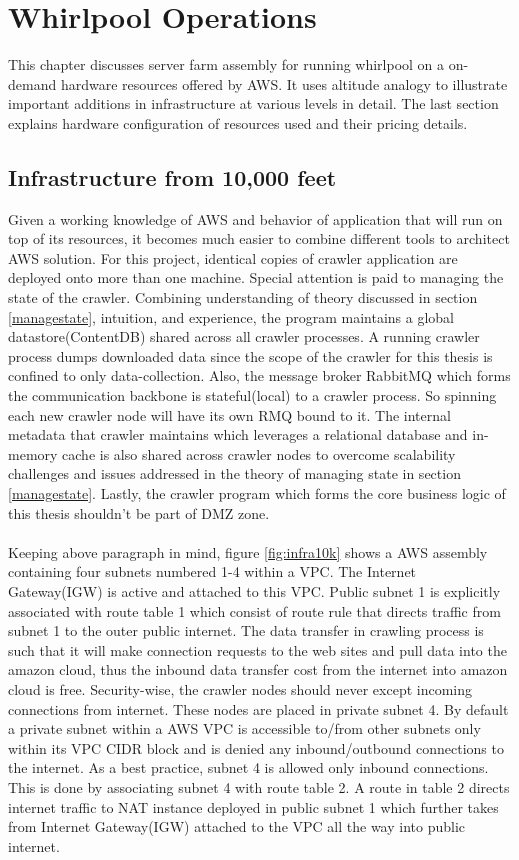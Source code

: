 \chapter{Whirlpool Operations}
This chapter discusses server farm assembly for running whirlpool on a on-demand hardware resources offered by
AWS. It uses altitude analogy to illustrate important additions in infrastructure at various levels in
detail. The last section explains hardware configuration of resources used and their pricing details.

\section{Infrastructure from 10,000 feet}\label{infra10k}

Given a working knowledge of AWS and behavior of application that will run on top of its resources, it
becomes much easier to combine different tools to architect AWS solution. For this project, identical
copies of crawler application are deployed onto more than one machine. Special attention is paid to managing the state of the crawler. Combining understanding of theory discussed in section \ref{managestate}, intuition, and experience, the program maintains a global datastore(ContentDB) shared across all crawler processes. A running crawler process dumps downloaded data since the scope of the crawler for this thesis is confined to only data-collection. Also, the message broker RabbitMQ which forms the communication backbone is stateful(local) to a crawler process. So spinning each new crawler node will have its own RMQ bound to it. The internal metadata that crawler maintains which leverages a relational database and in-memory cache is also shared across crawler nodes to overcome scalability challenges and issues addressed in the theory of managing state in section \ref{managestate}. Lastly, the crawler program which forms the core business logic of
this thesis shouldn't be part of DMZ zone.
\\
\\
\noindent
Keeping above paragraph in mind, figure \ref{fig:infra10k} shows a AWS assembly containing four subnets
numbered 1-4 within a VPC. The Internet Gateway(IGW) is active and attached to this VPC. Public subnet 1 is explicitly associated with route table 1 which consist of route rule that directs traffic from subnet 1 to the outer public internet. The data transfer in crawling process is such that it will make connection
requests to the web sites and pull data into the amazon cloud, thus the inbound data transfer cost from
the internet into amazon cloud is free. Security-wise, the crawler nodes should never except incoming
connections from internet. These nodes are placed in private subnet 4. By default a private subnet within a AWS VPC is accessible to/from other subnets only within its VPC CIDR block and is denied any inbound/outbound
connections to the internet. As a best practice, subnet 4 is allowed only inbound connections. This is
done by associating subnet 4 with route table 2. A route in table 2 directs internet traffic to NAT instance deployed in public subnet 1 which further takes from Internet Gateway(IGW) attached to the VPC all the way into public internet.

